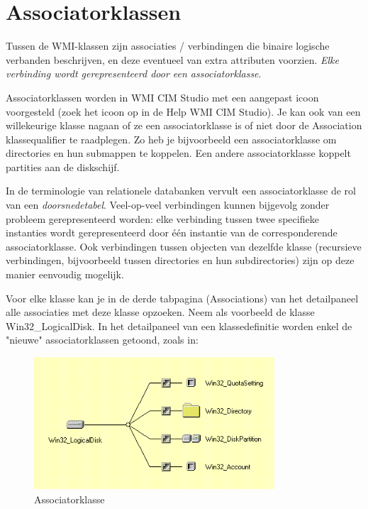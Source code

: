 \documentclass[11pt,a4paper]{report}
\begin{document}
\section{Associatorklassen}

Tussen de WMI-klassen zijn associaties / verbindingen die binaire logische verbanden beschrijven, en deze eventueel van extra attributen voorzien. \textit{Elke verbinding wordt gerepresenteerd door een associatorklasse}.
\par Associatorklassen worden in WMI CIM Studio met een aangepast icoon voorgesteld (zoek het icoon op in de Help WMI CIM Studio). Je kan ook van een willekeurige klasse nagaan of ze een associatorklasse is of niet door de Association klassequalifier te raadplegen.
Zo heb je bijvoorbeeld een associatorklasse om directories en hun submappen te koppelen. Een andere associatorklasse koppelt partities aan de diskschijf. 
\par In de terminologie van relationele databanken vervult een associatorklasse de rol van een \textit{doorsnedetabel}. Veel-op-veel verbindingen kunnen bijgevolg zonder probleem gerepresenteerd worden: elke verbinding tussen twee specifieke instanties wordt gerepresenteerd door één instantie van de corresponderende associatorklasse. Ook verbindingen tussen objecten van dezelfde klasse (recursieve verbindingen, bijvoorbeeld tussen directories en hun subdirectories) zijn op deze manier eenvoudig mogelijk.
\par Voor elke klasse kan je in de derde tabpagina (Associations) van het detailpaneel alle associaties met deze klasse opzoeken. Neem als voorbeeld de klasse Win32\_LogicalDisk. In het detailpaneel van een klassedefinitie worden enkel de "nieuwe" associatorklassen getoond, zoals in:

\begin{figure}[h]
	\caption{Associatorklasse}
	\centering
	\includegraphics[width=0.8\textwidth]{afbeeldingen/Logical_Disk_association.png}
\end{figure}
\end{document}
